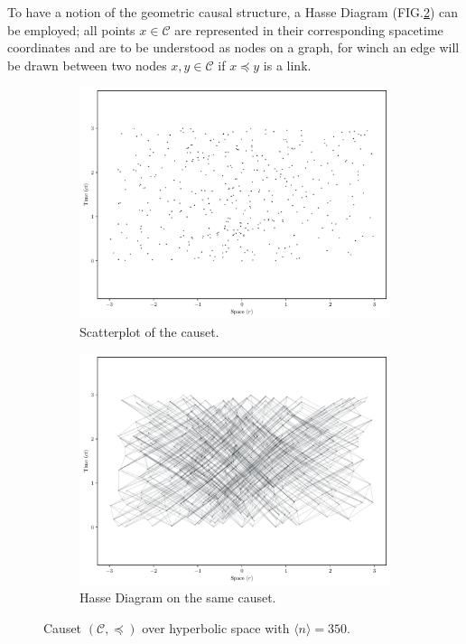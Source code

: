 \documentclass[%
 reprint,
 amsmath,amssymb,
 aps,
]{revtex4-2}
\begin{document}
To have a notion of the geometric causal structure, a Hasse Diagram (FIG.\ref{fig: Hasse Siagram}) can be employed; all points $x\in\mathcal{C}$ are represented in their corresponding spacetime coordinates and are to be understood as nodes on a graph, for winch an edge will be drawn between two nodes $x,y\in\mathcal{C}$ if $x\preceq y$ is a link.
\begin{figure}[h]
\centering
\begin{subfigure}{.4\textwidth}
  \centering
  \includegraphics[width=\linewidth]{Images/Causet.pdf}
  \caption{Scatterplot of the causet.}
  \label{fig: causet scatter}
\end{subfigure}%
\begin{subfigure}{\textwidth}
    \centering
\end{subfigure}
\begin{subfigure}{.4\textwidth}
  \centering
  \includegraphics[width=\linewidth]{Images/Hasse_Diagram.pdf}
  \caption{Hasse Diagram on the same causet.}
  \label{fig: Hasse Siagram}
\end{subfigure}
\caption{Causet $(\mathcal{C},\preceq)$ over hyperbolic space with $\langle n\rangle=350$.}
\label{fig: Hyperbolic}
\end{figure}
\FloatBarrier
\end{document}
